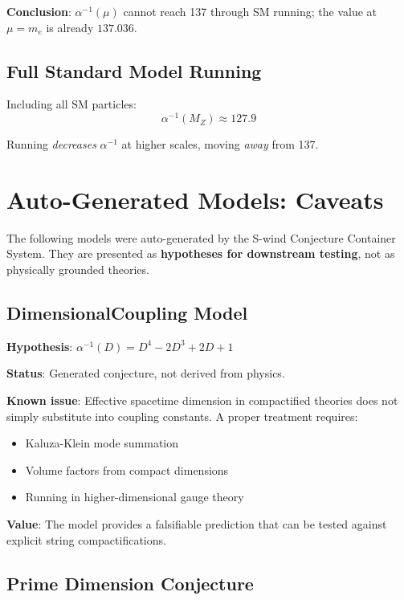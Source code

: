 \documentclass[11pt,a4paper]{article}
\begin{document}
\textbf{Conclusion}: $\alpha^{-1}(\mu)$ cannot reach 137 through SM running; the value at $\mu = m_e$ is already $137.036$.

\subsection{Full Standard Model Running}

Including all SM particles:
\begin{equation}
\alpha^{-1}(M_Z) \approx 127.9
\end{equation}

Running \textit{decreases} $\alpha^{-1}$ at higher scales, moving \textit{away} from 137.

\section{Auto-Generated Models: Caveats}

The following models were auto-generated by the S-wind Conjecture Container System. They are presented as \textbf{hypotheses for downstream testing}, not as physically grounded theories.

\subsection{DimensionalCoupling Model}

\textbf{Hypothesis}: $\alpha^{-1}(D) = D^4 - 2D^3 + 2D + 1$

\textbf{Status}: Generated conjecture, not derived from physics.

\textbf{Known issue}: Effective spacetime dimension in compactified theories does not simply substitute into coupling constants. A proper treatment requires:
\begin{itemize}
    \item Kaluza-Klein mode summation
    \item Volume factors from compact dimensions
    \item Running in higher-dimensional gauge theory
\end{itemize}

\textbf{Value}: The model provides a falsifiable prediction that can be tested against explicit string compactifications.

\subsection{Prime Dimension Conjecture}
\end{document}

